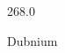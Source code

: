 \documentclass[12pt]{article}
\begin{document}
\hfill{}
\vfill
\begin{center}
  {\fontsize{50}{60}
  }

  268.0

Dubnium
\end{center}
\vfill
\end{document}
